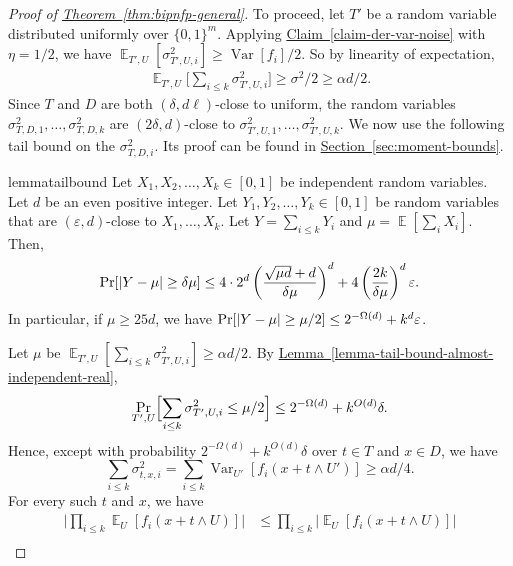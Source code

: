 \documentclass[11pt]{article}
\numberwithin{equation}{section}
\theoremstyle{definition}
\theoremstyle{plain}
\newcommand{\expref}[2]{\hyperref[#2]{#1~\ref{#2}}}
\newcommand{\zo}{\{0,1\}}
\def\eps{\varepsilon}
\def\Blocklength{\ell}
\DeclarePairedDelimiter{\abs}{\lvert}{\rvert}
\DeclareMathOperator*{\E}{\mathbb{E}}                 %
\DeclareMathOperator*{\Var}{Var}                 %
\begin{document}
\begin{proof}[Proof of {\expref{Theorem}{thm:bipnfp-general}}]
    To proceed, let $T'$ be a random variable distributed uniformly over $\zo^m$.
    Applying \expref{Claim}{claim-der-var-noise} with $\eta = 1/2$, we have $\E_{T',U}[ \sigma_{T',U,i}^2 ] \ge \Var[f_i] / 2$.
    So by linearity of expectation,
    \begin{align*}
      \E_{T',U} \Big[\sum_{i \le k} \sigma_{T',U,i}^2 \Big]
      \ge \sigma^2 / 2
      \ge \alpha d / 2 .
    \end{align*}
    Since $T$ and $D$ are both $(\delta, d\Blocklength)$-close to uniform, the random variables
    $\sigma_{T,D,1}^2, \ldots, \sigma_{T,D,k}^2$ are $(2 \delta, d)$-close to $\sigma_{T',U,1}^2, \ldots, \sigma_{T',U,k}^2$.
    We now use the following tail bound on the $\sigma_{T,D,i}^2$. 
    Its proof can be found in \expref{Section}{sec:moment-bounds}.
    \begin{restatable}{lemma}{tailbound} \label{lemma-tail-bound-almost-independent-real}
      Let $X_1, X_2, \ldots, X_k \in [0,1]$ be independent random variables.
      Let $d$ be an even positive integer.
      Let $Y_1, Y_2, \ldots, Y_k \in [0,1]$ be random variables that are $(\eps, d)$-close to $X_1, \ldots, X_k$.
      Let $Y = \sum_{i \le k} Y_i$ and $\mu = \E[\sum_i X_i]$.
      Then,
      \[
        \Pr[ \abs{Y - \mu} \ge \delta \mu ]
        \le 4 \cdot 2^d \left( \frac{\sqrt{\mu d} + d}{ \delta \mu} \right)^d + 4 \left( \frac{2k}{\delta \mu} \right)^d \eps.
      \]
      In particular, if $\mu \ge 25 d$, we have $\Pr[\abs{Y - \mu} \ge \mu/2] \le 2^{-\Omega(d)} + k^d \eps$.
    \end{restatable}
    Let $\mu$ be $\E_{T',U} [ \sum_{i \le k} \sigma_{T',U,i}^2 ] \ge \alpha d / 2$.
    By \expref{Lemma}{lemma-tail-bound-almost-independent-real},
    \begin{align}
      \Pr_{T',U} \Bigl[ \sum_{i \le k} \sigma_{T',U,i}^2 \le \mu / 2 \Bigr]
      \le 2^{-\Omega(d)} + k^{O(d)} \delta .\label{eqn:tail-bound-for-high-Tvar}
    \end{align}
    Hence, except with probability $2^{-\Omega(d)} + k^{O(d)} \delta$ over $t \in T$ and $x \in D$, we have
    \[
      \sum_{i \le k} \sigma_{t,x,i}^2
      = \sum_{i \le k} \Var_{U'}[f_i(x + t \wedge U')]
      \ge \alpha d / 4 .
    \]
    For every such $t$ and $x$, we have
    \begin{align} \label{eqn:small-mean-under-D-and-T}
      \Big| \prod_{i \le k} \E_{U}[f_i(x + t \wedge U)] \Big|
      &\le \prod_{i \le k} \Big| \E_{U}[f_i(x + t \wedge U)] \Big| \nonumber \\

\end{align}
\end{proof}
\end{document}
